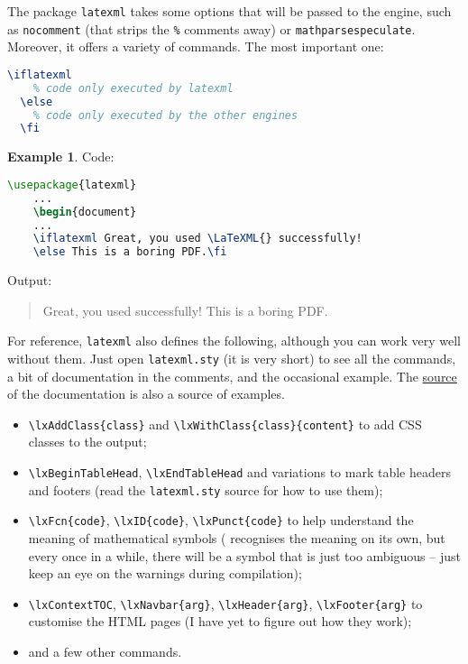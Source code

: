 \documentclass[a4paper]{article}
\theoremstyle{definition}
\newtheorem{exa}{Example}[subsection]
\begin{document}
The package \verb|latexml| takes some options that will be passed to the \LaTeXML{} engine, such as \verb|nocomment| (that strips the \verb|%| comments away) or \verb|mathparsespeculate|. Moreover, it offers a variety of commands. The most important one:
\begin{lstlisting}[language=TeX]
  \iflatexml
    % code only executed by latexml
  \else
    % code only executed by the other engines
  \fi
\end{lstlisting}

\begin{exa}
  Code:
  \begin{lstlisting}[language=TeX]
    \usepackage{latexml}
    ...
    \begin{document}
    ...
    \iflatexml Great, you used \LaTeXML{} successfully!
    \else This is a boring PDF.\fi
  \end{lstlisting}
  Output:
  \begin{quote}
    \iflatexml Great, you used \LaTeXML{} successfully!
    \else This is a boring PDF.\fi
  \end{quote}
\end{exa}

For reference, \verb|latexml| also defines the following, although you can work very well without them. Just open \verb|latexml.sty| (it is very short) to see all the commands, a bit of documentation in the comments, and the occasional example. The \href{https://github.com/brucemiller/LaTeXML/tree/master/doc/manual}{source} of the \LaTeXML{} documentation is also a source of examples.
\begin{itemize}
  \item \verb|\lxAddClass{class}| and \verb|\lxWithClass{class}{content}| to add CSS classes to the output;
  \item \verb|\lxBeginTableHead|, \verb|\lxEndTableHead| and variations to mark table headers and footers (read the \verb|latexml.sty| source for how to use them);
  \item \verb|\lxFcn{code}|, \verb|\lxID{code}|, \verb|\lxPunct{code}| to help \LaTeXML{} understand the meaning of mathematical symbols (\LaTeXML{} recognises the meaning on its own, but every once in a while, there will be a symbol that is just too ambiguous -- just keep an eye on the warnings during compilation);
  \item \verb|\lxContextTOC|, \verb|\lxNavbar{arg}|, \verb|\lxHeader{arg}|, \verb|\lxFooter{arg}| to customise the HTML pages (I have yet to figure out how they work);
  \item and a few other commands.
\end{itemize}
\end{document}
